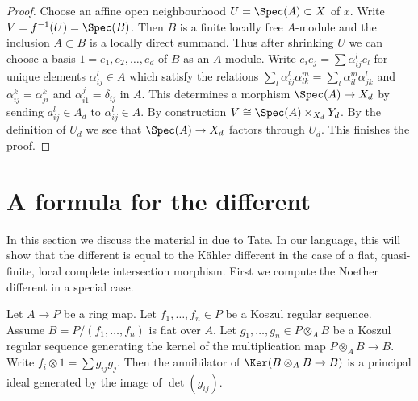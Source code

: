 \begin{proof}
Choose an affine open neighbourhood $U = \Spec(A) \subset X$ of $x$.
Write $V = f^{-1}(U) = \Spec(B)$. Then $B$ is a finite locally free
$A$-module and the inclusion $A \subset B$ is a locally direct summand.
Thus after shrinking $U$ we can choose a basis $1 = e_1, e_2, \ldots, e_d$
of $B$ as an $A$-module. Write
$e_i e_j = \sum \alpha_{ij}^l e_l$ for unique
elements $\alpha_{ij}^l \in A$ which satisfy the relations
$\sum_l \alpha_{ij}^l \alpha_{lk}^m = \sum_l \alpha_{il}^m \alpha _{jk}^l$
and $\alpha_{ij}^k = \alpha_{ji}^k$ and $\alpha_{i1}^j = \delta_{ij}$
in $A$. This determines a morphism $\Spec(A) \to X_d$ by sending
$a_{ij}^l \in A_d$ to $\alpha_{ij}^l \in A$. By construction
$V \cong \Spec(A) \times_{X_d} Y_d$. By the definition of $U_d$
we see that $\Spec(A) \to X_d$ factors through $U_d$. This
finishes the proof.
\end{proof}










\section{A formula for the different}
\label{section-formula-different}

\noindent
In this section we discuss the material in \cite[Appendix A]{Mazur-Roberts}
due to Tate. In our language, this will show that the different is
equal to the K\"ahler different in the case of a flat, quasi-finite,
local complete intersection morphism.
First we compute the Noether different in a special case.

\begin{lemma}
\label{lemma-tate}
\begin{reference}
\cite[Appendix]{Mazur-Roberts}
\end{reference}
Let $A \to P$ be a ring map. Let $f_1, \ldots, f_n \in P$ be a
Koszul regular sequence. Assume $B = P/(f_1, \ldots, f_n)$
is flat over $A$. Let $g_1, \ldots, g_n \in P \otimes_A B$
be a Koszul regular sequence generating the kernel of the multiplication
map $P \otimes_A B \to B$. Write $f_i \otimes 1 = \sum g_{ij} g_j$.
Then the annihilator of $\Ker(B \otimes_A B \to B)$ is a principal
ideal generated by the image of $\det(g_{ij})$.
\end{lemma}


